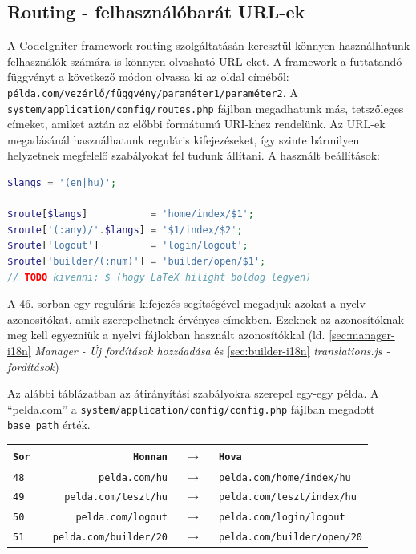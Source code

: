\documentclass[12pt,a4paper,twoside]{article}
\begin{document}
\subsection{Routing - felhasználóbarát URL-ek}

A CodeIgniter framework routing\cite{CI-Routing} szolgáltatásán keresztül
könnyen használhatunk felhasználók számára is könnyen olvasható URL-eket.
A framework a futtatandó függvényt a következő módon olvassa ki az oldal
címéből: \texttt{példa.com/vezérlő/függvény/paraméter1/paraméter2}.
A \texttt{system/application/config/routes.php} fájlban megadhatunk más,
tetszőleges címeket, amiket aztán az előbbi formátumú URI-khez rendelünk. Az
URL-ek megadásánál használhatunk reguláris kifejezéseket\cite{regex}, így szinte
bármilyen helyzetnek megfelelő szabályokat fel tudunk állítani. A használt
beállítások:

\begin{lstlisting}[language=PHP, firstnumber=46]
$langs = '(en|hu)';

$route[$langs]           = 'home/index/$1';
$route['(:any)/'.$langs] = '$1/index/$2';
$route['logout']         = 'login/logout';
$route['builder/(:num)'] = 'builder/open/$1';
// TODO kivenni: $ (hogy LaTeX hilight boldog legyen)
\end{lstlisting}

A 46. sorban egy reguláris kifejezés segítségével megadjuk azokat a
nyelv-azonosítókat, amik szerepelhetnek érvényes címekben. Ezeknek az
azonosítóknak meg kell egyezniük a nyelvi fájlokban használt azonosítókkal
(ld. \ref{sec:manager-i18n} \textit{Manager - Új fordítások hozzáadása} és
\ref{sec:builder-i18n} \textit{translations.js - fordítások})

Az alábbi táblázatban az átirányítási szabályokra szerepel egy-egy példa. A
``pelda.com'' a \texttt{system/application/config/config.php} fájlban megadott
\texttt{base\_path} érték.

\vspace{.4cm}
\begin{tabular*}{\textwidth}{>{\tt}l|>{\tt}r>{$\rightarrow$}c>{\tt}l}
  \rm Sor & \rm Honnan           & & \rm Hova        \\
  \hline
  48      & pelda.com/hu         & & pelda.com/home/index/hu  \\
  49      & pelda.com/teszt/hu   & & pelda.com/teszt/index/hu \\
  50      & pelda.com/logout     & & pelda.com/login/logout   \\
  51      & pelda.com/builder/20 & & pelda.com/builder/open/20
\end{tabular*}
\end{document}
